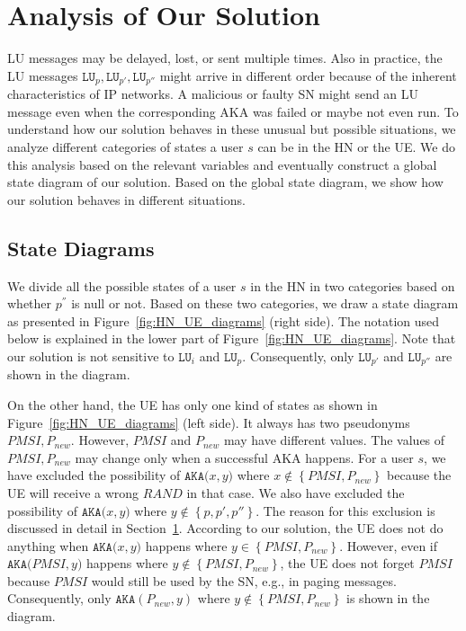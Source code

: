 \documentclass{llncs} %
\begin{document}
\section{Analysis of Our Solution} \label{sec:analysis}
LU messages may be delayed, lost, or sent multiple times. Also in practice, the LU messages $\texttt{LU}_p,\texttt{LU}_{p'},\texttt{LU}_{p''}$ might arrive in different order because of the inherent characteristics of IP networks. A malicious or faulty SN might send an LU message even when the corresponding AKA was failed or maybe not even run. To understand how our solution behaves in these unusual but possible situations, we analyze different categories of states a user $s$ can be in the HN or the UE. We do this analysis based on the relevant variables and eventually construct a global state diagram of our solution. Based on the global state diagram, we show how our solution behaves in different situations.

\subsection{State Diagrams}
We divide all the possible states of a user $s$ in the HN in two categories based on whether $p^{''}$ is null or not. Based on these two categories, we draw a state diagram as presented in Figure~\ref{fig:HN_UE_diagrams} (right side). The notation used below is explained in the lower part of Figure~\ref{fig:HN_UE_diagrams}. Note that our solution is not sensitive to $\texttt{LU}_{i}$ and $\texttt{LU}_{p}$. Consequently, only $\texttt{LU}_{p'}$ and $\texttt{LU}_{p''}$ are shown in the diagram.

On the other hand, the UE has only one kind of states as shown in Figure~\ref{fig:HN_UE_diagrams} (left side). It always has two pseudonyms $PMSI, P_{new}$. However, $PMSI$ and $P_{new}$ may have different values. The values of $PMSI,P_{new}$ may change only when a successful AKA happens. For a user $s$, we have excluded the possibility of  $\texttt{AKA($x,y$)}$ where $x \notin \left\lbrace PMSI,P_{new} \right\rbrace$ because the UE will receive a wrong $RAND$ in that case. We also have excluded the possibility of $\texttt{AKA($x,y$)}$ where $y \notin \left\lbrace p,p',p'' \right\rbrace$. The reason for this exclusion is discussed in detail in Section~\ref{sec:analysis}. According to our solution, the UE does not do anything when $\texttt{AKA($x,y$)}$ happens where $y \in \left\lbrace PMSI,P_{new} \right\rbrace$. However, even if $\texttt{AKA($PMSI,y$)}$ happens where $y \notin  \left\lbrace PMSI,P_{new} \right\rbrace$, the UE does not forget $PMSI$ because $PMSI$ would still be used by the SN, e.g., in paging messages. Consequently, only $\texttt{AKA}(P_{new},y)$ where $y \notin  \left\lbrace PMSI,P_{new} \right\rbrace$ is shown in the diagram.
\end{document}
